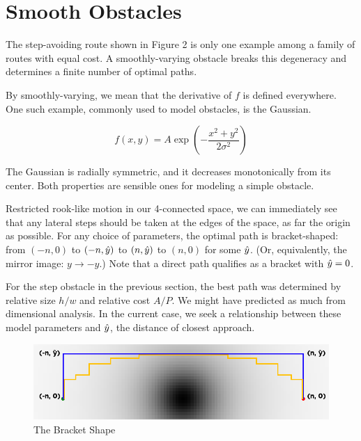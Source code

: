 \section{Smooth Obstacles}
The step-avoiding route shown in Figure 2 is only one example among a family of routes with equal cost. A smoothly-varying obstacle breaks this degeneracy and determines a finite number of optimal paths.

By smoothly-varying, we mean that the derivative of $f$ is defined everywhere. One such example, commonly used to model obstacles, is the Gaussian.

\begin{equation}
f(x, y) = A \exp\left(-\displaystyle\frac{x^2+y^2}{2\sigma^2}\right)
\end{equation}

The Gaussian is radially symmetric, and it decreases monotonically from its center. Both properties are sensible ones for modeling a simple obstacle.

Restricted rook-like motion in our 4-connected space, we can immediately see that any lateral steps should  be taken at the edges of the space, as far the origin as possible. For any choice of parameters, the optimal path is bracket-shaped: from $(-n,0)$ to $(-n, \hat{y})$ to $(n, \hat{y})$ to $(n,0)$ for some $\hat{y}$. (Or, equivalently, the mirror image: $y \rightarrow -y$.) Note that a direct path qualifies as a bracket with $\hat{y}=0$.

For the step obstacle in the previous section, the best path was determined by relative size $h/w$ and relative cost $A/P$. We might have predicted as much from dimensional analysis. In the current case, we seek a relationship between these model parameters and $\hat{y}$, the distance of closest approach.


\begin{figure}
\includegraphics[width=\columnwidth]{graphix/bracket.png}
\caption{The Bracket Shape}
\label{fig:bracket}
\end{figure}